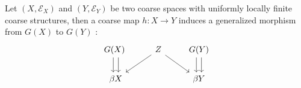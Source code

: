 \begin{prop}
Let $(X,\mathcal E_X)$ and $(Y,\mathcal E_Y)$ be two coarse spaces with uniformly locally finite coarse structures, then a coarse map $h :X\rightarrow Y$ induces a generalized morphism from $G(X)$ to $G(Y)$ :
\[\begin{tikzcd}
G(X)\arrow[xshift=-0.7ex]{d}\arrow[xshift=0.7ex]{d} \ & \arrow{dl} Z \arrow{dr} & G(Y)\arrow[xshift=-0.7ex]{d}\arrow[xshift=0.7ex]{d} \\
\beta X & &\beta Y \\
\end{tikzcd}\] 
\end{prop}




































